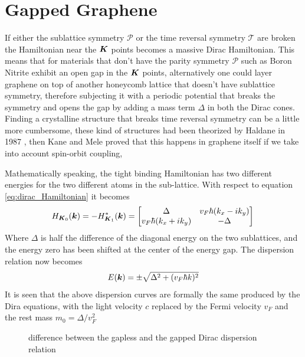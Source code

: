 \section{Gapped Graphene}
If either the sublattice symmetry $\mathcal P$ or the time reversal symmetry $\mathcal T$ are broken the Hamiltonian near the $\boldsymbol{K}$ points becomes a massive Dirac Hamiltonian.
This means that for materials that don't have the parity symmetry $\mathcal P$ such as Boron Nitrite exhibit an open gap in the $\boldsymbol{K}$ points, alternatively one could layer graphene on top of another honeycomb lattice that doesn't have sublattice symmetry, therefore subjecting it with a periodic potential that breaks the symmetry and opens the gap by adding a mass term $\Delta$ in both the Dirac cones.\\
Finding a crystalline structure that breaks time reversal symmetry can be a little more cumbersome, these kind of structures had been theorized by Haldane in 1987 \cite{haldane1988model}, then Kane and Mele \cite{kane2005quantum} proved that this happens in graphene itself if we take into account spin-orbit coupling, 


Mathematically speaking, the tight binding Hamiltonian has two different energies for the two different atoms in the sub-lattice. With respect to equation \ref{eq:dirac_Hamiltonian} it becomes
\begin{equation}
    H_{\boldsymbol{K}_0}(\boldsymbol{k})=
    -H^*_{\boldsymbol{K}_1}(\boldsymbol{k})=
    \begin{bmatrix}
        \Delta& v_F\hbar(k_x-ik_y)\\
        v_F\hbar(k_x+ik_y)&-\Delta
    \end{bmatrix}
    \label{eq:gapped-dirac}
\end{equation}
Where $\Delta$ is half the difference of the diagonal energy on the two sublattices, and the energy zero has been shifted at the center of the energy gap. The dispersion relation now becomes
\begin{equation}
    E(\boldsymbol{k})=\pm\sqrt{\Delta^2 + (v_F\hbar k)^2}
\end{equation}
It is seen that the above dispersion curves are formally the same produced by the Dira equations, with the light velocity $c$ replaced by the Fermi velocity $v_F$ and the rest mass $m_0=\Delta/v_F^2$

\begin{figure}[h]
    \caption{difference between the gapless and the gapped Dirac dispersion relation}
    \label{fig:dispersion-1D}
\end{figure}